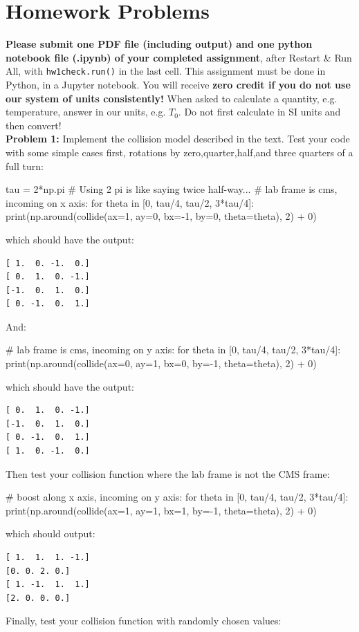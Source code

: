 \documentclass[12pt]{article}
\begin{document}
\section{Homework Problems}

\noindent
{\bf Please submit one PDF file (including output) and one python
  notebook file (.ipynb) of your completed assignment}, after Restart
\& Run All, with {\tt hw1check.run()} in the last cell.  This
assignment must be done in Python, in a Jupyter notebook.
You will receive {\bf zero credit if you do not use our system of
  units consistently!}  When asked to calculate a quantity,
e.g. temperature, answer in our units, e.g. $T_0$.  Do not first
calculate in SI units and then convert!\\[8pt]

\noindent
{\bf Problem 1:} Implement the collision model described in the text.
Test your code with some simple cases first, rotations by
zero,quarter,half,and three quarters of a full turn:
\begin{python}
tau = 2*np.pi # Using 2 pi is like saying twice half-way...
# lab frame is cms, incoming on x axis:
for theta in [0, tau/4, tau/2, 3*tau/4]:
    print(np.around(collide(ax=1, ay=0, bx=-1, by=0, theta=theta), 2) + 0)
\end{python}
which should have the output:
\begin{verbatim}
[ 1.  0. -1.  0.]
[ 0.  1.  0. -1.]
[-1.  0.  1.  0.]
[ 0. -1.  0.  1.]
\end{verbatim}
And:
\begin{python}
# lab frame is cms, incoming on	y axis:
for theta in [0, tau/4, tau/2, 3*tau/4]:
    print(np.around(collide(ax=0, ay=1, bx=0, by=-1, theta=theta), 2) + 0)
\end{python}
which should have the output:
\begin{verbatim}
[ 0.  1.  0. -1.]
[-1.  0.  1.  0.]
[ 0. -1.  0.  1.]
[ 1.  0. -1.  0.]
\end{verbatim}
Then test your collision function where the lab frame is not the CMS frame:
\begin{python}
# boost along x axis, incoming on y axis:
for theta in [0, tau/4, tau/2, 3*tau/4]:
    print(np.around(collide(ax=1, ay=1, bx=1, by=-1, theta=theta), 2) + 0)
\end{python}
which should output:
\begin{verbatim}
[ 1.  1.  1. -1.]
[0. 0. 2. 0.]
[ 1. -1.  1.  1.]
[2. 0. 0. 0.]
\end{verbatim} \vskip 0.25cm
Finally, test your collision function with randomly chosen values:
\end{document}
